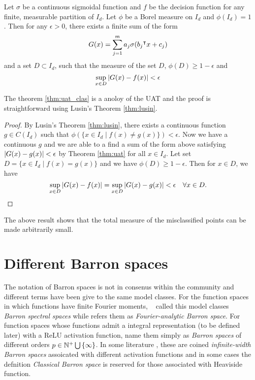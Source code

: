 \begin{theorem}
    \label{thm:uat_clas}
    Let $\sigma$ be a continuous sigmoidal function and $f$ be the decision
    function for any finite, measurable partition of $I_d$. Let $\phi$ be a
    Borel measure on $I_d$ and $\phi(I_d) = 1$. Then for any $\epsilon>0$, there
    exists a finite sum of the form
    \begin{equation}
        G(x) = \sum_{j=1}^{m} a_j \sigma(b_j{}^{\intercal} x + c_j)
    \end{equation}
    and a set $D\subset I_d$, such that the measure of the set $D$, $\phi(D) \geq 1 - \epsilon$ and
    \begin{equation}
        \sup_{x\in D}\left| G(x) - f(x) \right| < \epsilon
    \end{equation}
\end{theorem}

The theorem \eqref{thm:uat_clas} is a anoloy of the UAT and the proof is
straightforward using Lusin's Theorem \eqref{thm:lusin}.

\begin{proof}
    By Lusin's Theorem \eqref{thm:lusin}, there exists a continuous function $g
    \in C(I_d)$ such that $\phi(\{x\in I_d \mid f(x) \not= g(x)\}) < \epsilon$.
    Now we have a continuous $g$ and we are able to a find a sum of the form
    above satisfying $\left| G(x) - g(x) \right| < \epsilon$ by Theorem \eqref{thm:uat}
    for all $x\in I_d$. Let set $D = \{x\in I_d \mid f(x) = g(x)\}$ and we have
    $\phi(D) \geq 1 - \epsilon$. Then for $x\in D$, we have
    \begin{equation}
        \sup_{x\in D}\left| G(x)-f(x) \right| = \sup_{x\in D}\left| G(x) - g(x) \right| < \epsilon 
        \quad \forall x\in D.
    \end{equation}
\end{proof}

The above result shows that the total measure of the misclassified points can be made arbitrarily small.

\section{Different Barron spaces}

The notation of Barron spaces is not in consenus within the community and
different terms have been give to the same model classes. For the function
spaces in which functions have finite Fourier moments,
~\cite{xuFiniteNeuronMethod2020} called this model classes \textit{Barron
spectral spaces} while \cite{carageaNeuralNetworkApproximation2022} refers them
as \textit{Fourier-analytic Barron space}. For function spaces whose functions
admit a integral representation (to be defined later) with a ReLU activation
function, \cite{eBarronSpaceFlowinduced2021} name them simply as \textit{Barron
spaces} of different orders $p \in \mathbb{N}^+ \bigcup\,\{\infty\}$. In some
literature \TOCITE, these are coined \textit{infinite-width Barron spaces}
assoicated with different activation functions and in some cases the defnition
\textit{Classical Barron space} is reserved for those associated with Heaviside
function.

